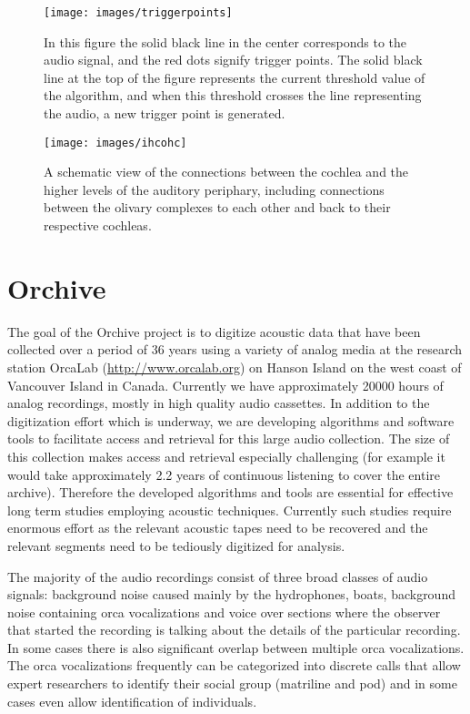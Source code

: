 \begin{figure}[t]
\begin{center}
\texttt{[image: images/triggerpoints]}
\caption{ In this figure the solid black line in the center
  corresponds to the audio signal, and the red dots signify trigger
  points.  The solid black line at the top of the figure represents
  the current threshold value of the algorithm, and when this
  threshold crosses the line representing the audio, a new trigger
  point is generated.}
\label{fig:triggerpoints} 
\end{center} 
\end{figure} 

\begin{figure}[t]
\begin{center}
\texttt{[image: images/ihcohc]}
\caption{
A schematic view of the connections between the cochlea and the higher
levels of the auditory periphary, including connections between the
olivary complexes to each other and back to their respective cochleas.} 
\label{fig:ihcohc} 
\end{center} 
\end{figure} 


\section{Orchive}

The goal of the Orchive project is to digitize acoustic data that have
been collected over a period of 36 years using a variety of analog
media at the research station OrcaLab (\url{http://www.orcalab.org}) on
Hanson Island on the west coast of Vancouver Island in
Canada. Currently we have approximately 20000 hours of analog
recordings, mostly in high quality audio cassettes. In addition to the
digitization effort which is underway, we are developing algorithms and
software tools to facilitate access and retrieval for this large audio
collection.  The size of this collection makes access and retrieval
especially challenging (for example it would take approximately 2.2
years of continuous listening to cover the entire archive).  Therefore
the developed algorithms and tools are essential for effective long
term studies employing acoustic techniques. Currently such studies
require enormous effort as the relevant acoustic tapes need to be
recovered and the relevant segments need to be tediously digitized
for analysis.

The majority of the audio recordings consist of three broad classes of
audio signals: background noise caused mainly by the hydrophones,
boats, background noise containing orca vocalizations and voice
over sections where the observer that started the recording is talking
about the details of the particular recording. In some cases there is
also significant overlap between multiple orca vocalizations. The orca
vocalizations frequently can be categorized into discrete calls that
allow expert researchers to identify their social group (matriline and
pod) and in some cases even allow identification of individuals.

